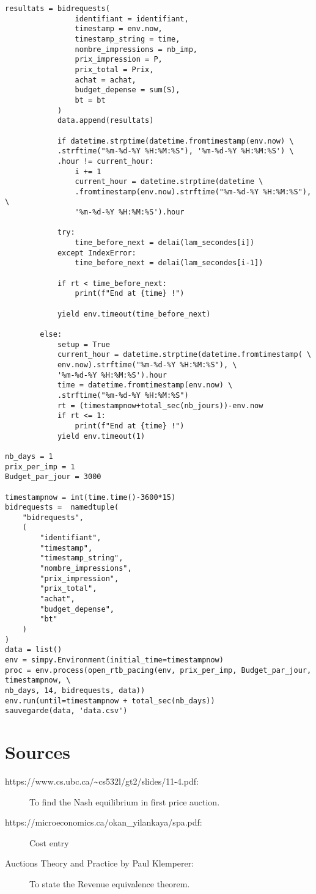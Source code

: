 \documentclass[12pt]{article}
\begin{document}
\begin{lstlisting}[style=Python]
			resultats = bidrequests(
				identifiant = identifiant,
				timestamp = env.now,
				timestamp_string = time,
				nombre_impressions = nb_imp,
				prix_impression = P,
				prix_total = Prix,
				achat = achat,
				budget_depense = sum(S),
				bt = bt
			)
			data.append(resultats)
			
			if datetime.strptime(datetime.fromtimestamp(env.now) \
			.strftime("%m-%d-%Y %H:%M:%S"), '%m-%d-%Y %H:%M:%S') \
			.hour != current_hour:
				i += 1 
				current_hour = datetime.strptime(datetime \
				.fromtimestamp(env.now).strftime("%m-%d-%Y %H:%M:%S"), \
				'%m-%d-%Y %H:%M:%S').hour
			
			try:
				time_before_next = delai(lam_secondes[i])
			except IndexError:
				time_before_next = delai(lam_secondes[i-1])
			
			if rt < time_before_next:
				print(f"End at {time} !")
			
			yield env.timeout(time_before_next)
		
		else:
			setup = True
			current_hour = datetime.strptime(datetime.fromtimestamp( \
			env.now).strftime("%m-%d-%Y %H:%M:%S"), \
			'%m-%d-%Y %H:%M:%S').hour
			time = datetime.fromtimestamp(env.now) \
			.strftime("%m-%d-%Y %H:%M:%S")
			rt = (timestampnow+total_sec(nb_jours))-env.now
			if rt <= 1:
				print(f"End at {time} !")
			yield env.timeout(1) 
			
nb_days = 1
prix_per_imp = 1
Budget_par_jour = 3000

timestampnow = int(time.time()-3600*15)
bidrequests =  namedtuple(
	"bidrequests", 
	(
		"identifiant", 
		"timestamp", 
		"timestamp_string",
		"nombre_impressions",
		"prix_impression",
		"prix_total",
		"achat",
		"budget_depense",
		"bt"
	)
)
data = list()
env = simpy.Environment(initial_time=timestampnow)
proc = env.process(open_rtb_pacing(env, prix_per_imp, Budget_par_jour, timestampnow, \
nb_days, 14, bidrequests, data))
env.run(until=timestampnow + total_sec(nb_days))
sauvegarde(data, 'data.csv')
\end{lstlisting}

\newpage
\section*{Sources}
\begin{description}
\item[https://www.cs.ubc.ca/\textasciitilde cs532l/gt2/slides/11-4.pdf:] To find the Nash equilibrium in first price auction.
\item[https://microeconomics.ca/okan\_yilankaya/spa.pdf: ] Cost entry
\item[Auctions Theory and Practice by Paul Klemperer:] To state the Revenue equivalence theorem.
\end{description}
\end{document}
